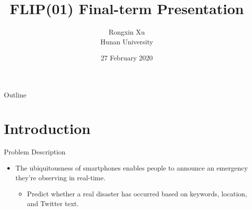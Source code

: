 \documentclass[
 size=12pt,
 paper=smartboard, %
 mode=present, %
 display=slides, %
 style=tuliplab,  %
 pauseslide,
 fleqn,leqno,clock]{powerdot}
\title{FLIP(01) Final-term Presentation}
\author{Rongxin Xu\\
Hunan University
}
\date{27 February 2020}
\begin{document}
\maketitle

\begin{slide}[toc=,bm=]{Outline}
  \tableofcontents[content=sections]
\end{slide}

\section{Introduction}

\begin{slide}{Problem Description}
  \begin{itemize}
    \item
		The ubiquitousness of smartphones enables 
		people to announce an emergency they’re 
		observing in real-time. 
          \begin{itemize}
            \item
				Predict whether a real disaster has occurred 
				based on keywords, location, and Twitter text.
          \end{itemize}
  \end{itemize}
\end{slide}
\end{document}
